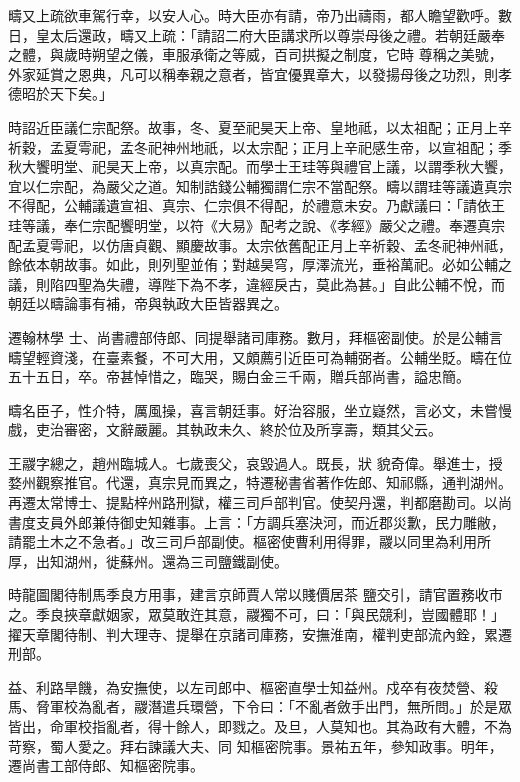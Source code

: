 \begin{pinyinscope}
 疇又上疏欲車駕行幸，以安人心。時大臣亦有請，帝乃出禱雨，都人瞻望歡呼。數日，皇太后還政，疇又上疏：「請詔二府大臣講求所以尊崇母後之禮。若朝廷嚴奉之體，與歲時朔望之儀，車服承衛之等威，百司拱擬之制度，它時
 尊稱之美號，外家延賞之恩典，凡可以稱奉親之意者，皆宜優異章大，以發揚母後之功烈，則孝德昭於天下矣。」



 時詔近臣議仁宗配祭。故事，冬、夏至祀昊天上帝、皇地祗，以太祖配；正月上辛祈穀，孟夏雩祀，孟冬祀神州地祇，以太宗配；正月上辛祀感生帝，以宣祖配；季秋大饗明堂、祀昊天上帝，以真宗配。而學士王珪等與禮官上議，以謂季秋大饗，宜以仁宗配，為嚴父之道。知制誥錢公輔獨謂仁宗不當配祭。疇以謂珪等議遺真宗
 不得配，公輔議遺宣祖、真宗、仁宗俱不得配，於禮意未安。乃獻議曰：「請依王珪等議，奉仁宗配饗明堂，以符《大易》配考之說、《孝經》嚴父之禮。奉遷真宗配孟夏雩祀，以仿唐貞觀、顯慶故事。太宗依舊配正月上辛祈穀、孟冬祀神州祗，餘依本朝故事。如此，則列聖並侑；對越昊穹，厚澤流光，垂裕萬祀。必如公輔之議，則陷四聖為失禮，導陛下為不孝，違經戾古，莫此為甚。」自此公輔不悅，而朝廷以疇論事有補，帝與執政大臣皆器異之。



 遷翰林學
 士、尚書禮部侍郎、同提舉諸司庫務。數月，拜樞密副使。於是公輔言疇望輕資淺，在臺素餐，不可大用，又頗薦引近臣可為輔弼者。公輔坐貶。疇在位五十五日，卒。帝甚悼惜之，臨哭，賜白金三千兩，贈兵部尚書，謚忠簡。



 疇名臣子，性介特，厲風操，喜言朝廷事。好治容服，坐立嶷然，言必文，未嘗慢戲，吏治審密，文辭嚴麗。其執政未久、終於位及所享壽，類其父云。



 王鬷字總之，趙州臨城人。七歲喪父，哀毀過人。既長，狀
 貌奇偉。舉進士，授婺州觀察推官。代還，真宗見而異之，特遷秘書省著作佐郎、知祁縣，通判湖州。再遷太常博士、提點梓州路刑獄，權三司戶部判官。使契丹還，判都磨勘司。以尚書度支員外郎兼侍御史知雜事。上言：「方調兵塞決河，而近郡災歉，民力雕敝，請罷土木之不急者。」改三司戶部副使。樞密使曹利用得罪，鬷以同里為利用所厚，出知湖州，徙蘇州。還為三司鹽鐵副使。



 時龍圖閣待制馬季良方用事，建言京師賈人常以賤價居茶
 鹽交引，請官置務收市之。季良挾章獻姻家，眾莫敢迕其意，鬷獨不可，曰：「與民競利，豈國體耶！」擢天章閣待制、判大理寺、提舉在京諸司庫務，安撫淮南，權判吏部流內銓，累遷刑部。



 益、利路旱饑，為安撫使，以左司郎中、樞密直學士知益州。戍卒有夜焚營、殺馬、脅軍校為亂者，鬷潛遣兵環營，下令曰：「不亂者斂手出門，無所問。」於是眾皆出，命軍校指亂者，得十餘人，即戮之。及旦，人莫知也。其為政有大體，不為苛察，蜀人愛之。拜右諫議大夫、同
 知樞密院事。景祐五年，參知政事。明年，遷尚書工部侍郎、知樞密院事。




\end{pinyinscope}
